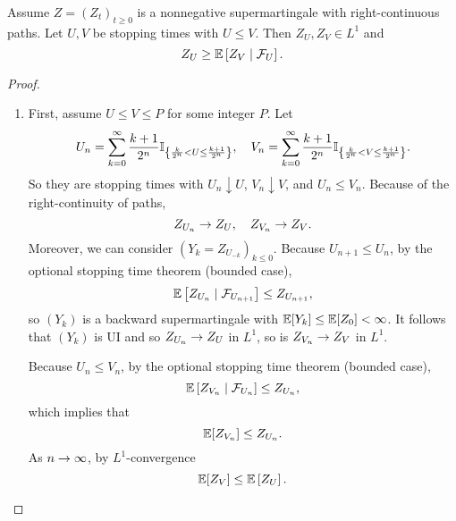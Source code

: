 \begin{thm}
    Assume $Z = (Z_t)_{t \geq 0}$ is a nonnegative supermartingale with right-continuous paths. Let $U,V$ be stopping times with $U \leq V$. Then $Z_U,Z_V \in L^1$ and 
    \begin{equation*}
        Z_U \geq \mathbb{E}\left[Z_V \mid \mathcal{F}_U\right].
    \end{equation*}
\end{thm}
\begin{proof}
    \begin{enumerate}[label=(\roman*)]
        \item First, assume $U \leq V \leq P$ for some integer $P$. Let
        \begin{equation*}
            U_n = \sum_{k=0}^\infty \frac{k+1}{2^n}\mathbb{I}_{\left\{\frac{k}{2^n} < U \leq \frac{k+1}{2^n}\right\}},\quad V_n = \sum_{k=0}^\infty \frac{k+1}{2^n}\mathbb{I}_{\left\{\frac{k}{2^n} < V \leq \frac{k+1}{2^n}\right\}}.
        \end{equation*}
        So they are stopping times with $U_n \downarrow U$, $V_n \downarrow V$, and $U_n \leq V_n$. Because of the right-continuity of paths,
        \begin{equation*}
            Z_{U_n} \rightarrow Z_U,\quad Z_{V_n} \rightarrow Z_V.
        \end{equation*}
        Moreover, we can consider $(Y_{k} = Z_{U_{-k}})_{k \leq 0}$. Because $U_{n+1} \leq U_{n}$, by the optional stopping time theorem (bounded case),
        \begin{equation*}
            \mathbb{E}\left[Z_{U_n} \mid \mathcal{F}_{U_{n+1}}\right] \leq Z_{U_{n+1}},
        \end{equation*}
        so $(Y_{k})$ is a backward supermartingale with $\mathbb{E}[Y_{k}] \leq \mathbb{E}[Z_0] < \infty$. It follows that $(Y_k)$ is UI and so $Z_{U_n} \rightarrow Z_U$ in $L^1$, so is $ Z_{V_n} \rightarrow Z_V$ in $L^1$.

        \noindent Because $U_n \leq V_n$, by the optional stopping time theorem (bounded case),
        \begin{equation*}
            \mathbb{E}\left[Z_{V_n} \mid \mathcal{F}_{U_n}\right] \leq Z_{U_n},
        \end{equation*}
        which implies that
        \begin{equation*}
            \mathbb{E}[Z_{V_n}] \leq Z_{U_n}.
        \end{equation*}
        As $n \rightarrow \infty$, by $L^1$-convergence
        \begin{equation*}
            \mathbb{E}[Z_{V}] \leq \mathbb{E}\left[Z_{U}\right].
        \end{equation*}


\end{enumerate}
\end{proof}
